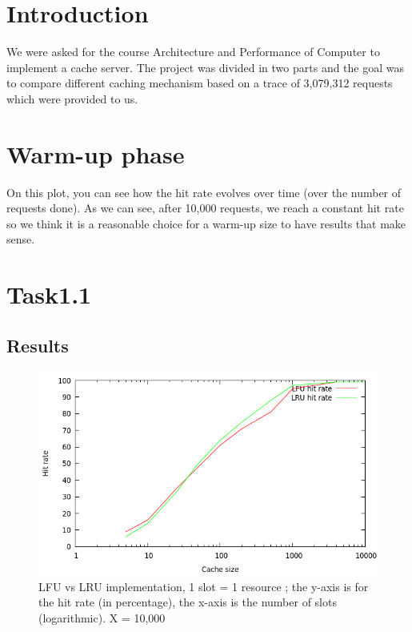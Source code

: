 \section{Introduction}
We were asked for the course Architecture and Performance of Computer to
implement a cache server. The project was divided in two parts and the 
goal was to compare different caching mechanism based on a trace
of 3,079,312 requests which were provided to us.

\section{Warm-up phase}

On this plot, you can see how the hit rate evolves over time (over the
number of requests done). As we can
see, after 10,000 requests, we reach a constant hit rate so we think it is
a reasonable choice for a warm-up size to have results that make sense. 

\section{Task1.1}

\subsection{Results}

\begin{figure}[!ht]
    \centering
    \includegraphics[width=\linewidth]{task1.png}
    \caption{LFU vs LRU implementation, 1 slot = 1 resource ; the y-axis is
    for the hit rate (in percentage), the x-axis is the number of slots
    (logarithmic). X = 10,000}
\end{figure}
\FloatBarrier

